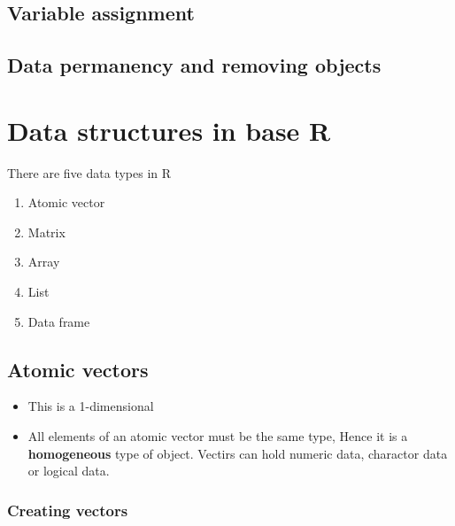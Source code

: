\documentclass[]{book}
\begin{document}
\hypertarget{variable-assignment}{%
\section{Variable assignment}\label{variable-assignment}}

\hypertarget{section}{%
\section{}\label{section}}

\hypertarget{data-permanency-and-removing-objects}{%
\section{Data permanency and removing objects}\label{data-permanency-and-removing-objects}}

\hypertarget{intro}{%
\chapter{Data structures in base R}\label{intro}}

There are five data types in R

\begin{enumerate}
\def\labelenumi{\arabic{enumi}.}
\item
  Atomic vector
\item
  Matrix
\item
  Array
\item
  List
\item
  Data frame
\end{enumerate}

\hypertarget{atomic-vectors}{%
\section{Atomic vectors}\label{atomic-vectors}}

\begin{itemize}
\item
  This is a 1-dimensional
\item
  All elements of an atomic vector must be the same type, Hence it is a \textbf{homogeneous} type of object. Vectirs can hold numeric data, charactor data or logical data.
\end{itemize}

\hypertarget{creating-vectors}{%
\subsection{Creating vectors}\label{creating-vectors}}
\end{document}
